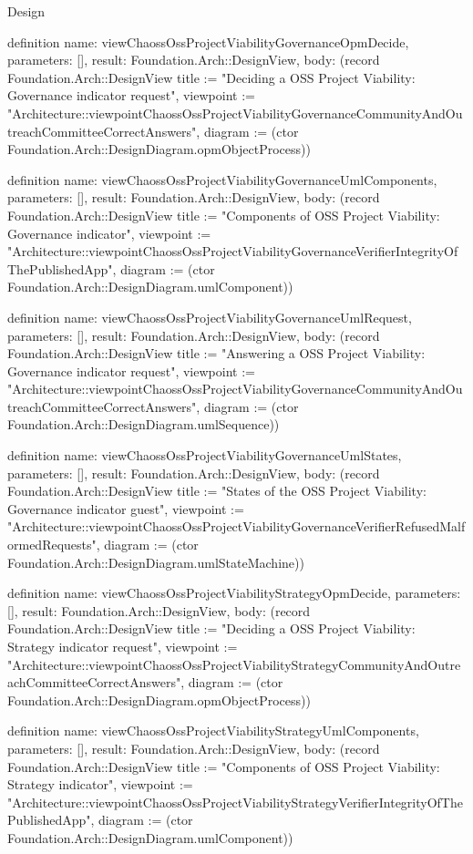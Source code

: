 \begin{lexlean}{Design}
\begin{semanticmodule}
definition{
  name: viewChaossOssProjectViabilityGovernanceOpmDecide,
  parameters: [],
  result: Foundation.Arch::DesignView,
  body: (record Foundation.Arch::DesignView {title := "Deciding a OSS Project Viability: Governance indicator request", viewpoint := "Architecture::viewpointChaossOssProjectViabilityGovernanceCommunityAndOutreachCommitteeCorrectAnswers", diagram := (ctor Foundation.Arch::DesignDiagram.opmObjectProcess)})
}

definition{
  name: viewChaossOssProjectViabilityGovernanceUmlComponents,
  parameters: [],
  result: Foundation.Arch::DesignView,
  body: (record Foundation.Arch::DesignView {title := "Components of OSS Project Viability: Governance indicator", viewpoint := "Architecture::viewpointChaossOssProjectViabilityGovernanceVerifierIntegrityOfThePublishedApp", diagram := (ctor Foundation.Arch::DesignDiagram.umlComponent)})
}

definition{
  name: viewChaossOssProjectViabilityGovernanceUmlRequest,
  parameters: [],
  result: Foundation.Arch::DesignView,
  body: (record Foundation.Arch::DesignView {title := "Answering a OSS Project Viability: Governance indicator request", viewpoint := "Architecture::viewpointChaossOssProjectViabilityGovernanceCommunityAndOutreachCommitteeCorrectAnswers", diagram := (ctor Foundation.Arch::DesignDiagram.umlSequence)})
}

definition{
  name: viewChaossOssProjectViabilityGovernanceUmlStates,
  parameters: [],
  result: Foundation.Arch::DesignView,
  body: (record Foundation.Arch::DesignView {title := "States of the OSS Project Viability: Governance indicator guest", viewpoint := "Architecture::viewpointChaossOssProjectViabilityGovernanceVerifierRefusedMalformedRequests", diagram := (ctor Foundation.Arch::DesignDiagram.umlStateMachine)})
}

definition{
  name: viewChaossOssProjectViabilityStrategyOpmDecide,
  parameters: [],
  result: Foundation.Arch::DesignView,
  body: (record Foundation.Arch::DesignView {title := "Deciding a OSS Project Viability: Strategy indicator request", viewpoint := "Architecture::viewpointChaossOssProjectViabilityStrategyCommunityAndOutreachCommitteeCorrectAnswers", diagram := (ctor Foundation.Arch::DesignDiagram.opmObjectProcess)})
}

definition{
  name: viewChaossOssProjectViabilityStrategyUmlComponents,
  parameters: [],
  result: Foundation.Arch::DesignView,
  body: (record Foundation.Arch::DesignView {title := "Components of OSS Project Viability: Strategy indicator", viewpoint := "Architecture::viewpointChaossOssProjectViabilityStrategyVerifierIntegrityOfThePublishedApp", diagram := (ctor Foundation.Arch::DesignDiagram.umlComponent)})
}


\end{semanticmodule}
\end{lexlean}
